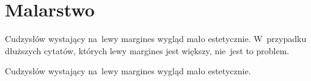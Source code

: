 \documentclass[a4paper,11pt]{article}
\begin{document}
\newpage
\section{Malarstwo}

\vspace{\spaceTwo}






\start {} Cudzysłów wystający na~lewy margines wygląd mało
estetycznie. W~przypadku dłuższych cytatów, których lewy margines jest
większy, nie~jest to problem.

\vspace{\spaceFour}


\start {} Cudzysłów wystający na~lewy margines wygląd mało
estetycznie.

\vspace{\spaceFour}









\end{document}
